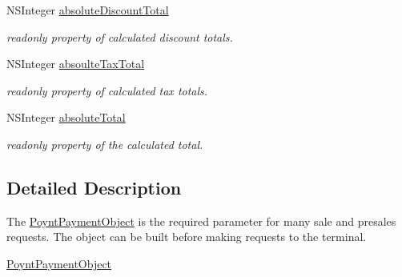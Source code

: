 \begin{DoxyCompactItemize}
N\+S\+Integer \hyperlink{interface_poynt_payment_object_aa5f2d0bac6ddbb63f1ada849fd4609d2}{absolute\+Discount\+Total}
\begin{DoxyCompactList}\small\item\em readonly property of calculated discount totals. \end{DoxyCompactList}\item 
N\+S\+Integer \hyperlink{interface_poynt_payment_object_a94b92d7e18d94d33330a7549e345c0eb}{absoulte\+Tax\+Total}
\begin{DoxyCompactList}\small\item\em readonly property of calculated tax totals. \end{DoxyCompactList}\item 
N\+S\+Integer \hyperlink{interface_poynt_payment_object_a4270b0767f8eaabd1b665c1b59bcd787}{absolute\+Total}
\begin{DoxyCompactList}\small\item\em readonly property of the calculated total. \end{DoxyCompactList}\end{DoxyCompactItemize}


\subsection{Detailed Description}
The \hyperlink{interface_poynt_payment_object}{Poynt\+Payment\+Object} is the required parameter for many sale and presales requests. The object can be built before making requests to the terminal. 

\hyperlink{interface_poynt_payment_object}{Poynt\+Payment\+Object}

